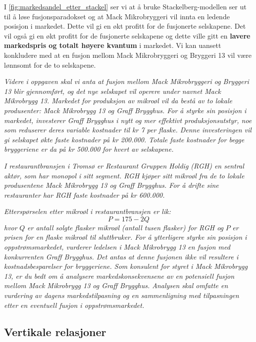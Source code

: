 \documentclass[
  12pt,
  a4paper,
  DIV=11,
  numbers=noendperiod]{scrartcl}
\begin{document}
I \autoref{fig:markedsandel_etter_stackel} ser vi at å bruke
Stackelberg-modellen ser ut til å løse fusjonsparadokset og at Mack
Mikrobryggeri vil innta en ledende posisjon i markedet. Dette vil gi en
økt profitt for de fusjonerte selskapene. Det vil også gi en økt profitt
for de fusjonerte selskapene og dette ville gitt en \textbf{lavere
markedspris og totalt høyere kvantum} i markedet. Vi kan uansett
konkludere med at en fusjon mellom Mack Mikrobryggeri og Bryggeri 13 vil
være lønnsomt for de to selskapene.

\clearpage

\textit{Videre i oppgaven skal vi anta at fusjon mellom Mack Mikrobryggeri og Bryggeri 13 blir gjennomført, og det nye selskapet vil operere under navnet Mack Mikrobrygg 13. Markedet for produksjon av mikroøl vil da bestå av to lokale produsenter: Mack Mikrobrygg 13 og Graff Brygghus. For å styrke sin posisjon i markedet, investerer Graff Brygghus i nytt og mer effektivt produksjonsutstyr, noe som reduserer deres variable kostnader til kr 7 per flaske. Denne investeringen vil gi selskapet økte faste kostnader på kr 200.000. Totale faste kostnader for begge bryggeriene er da på kr 500.000 for hvert av selskapene.}

\textit{I restaurantbransjen i Tromsø er Restaurant Gruppen Holdig (RGH) en sentral aktør, som har monopol i sitt segment. RGH kjøper sitt mikroøl fra de to lokale produsentene Mack Mikrobrygg 13 og Graff Brygghus. For å drifte sine restauranter har RGH faste kostnader på kr 600.000.}

\textit{Etterspørselen etter mikroøl i restaurantbransjen er lik:} 
$$
P = 175 - 2Q
$$ 
\textit{hvor }$Q$\textit{ er antall solgte flasker mikroøl (antall tusen flasker) for RGH og }$P$\textit{ er prisen for en flaske mikroøl til sluttbruker. For å ytterligere styrke sin posisjon i oppstrømsmarkedet, vurderer ledelsen i Mack Mikrobrygg 13 en fusjon med konkurrenten Graff Brygghus. Det antas at denne fusjonen ikke vil resultere i kostnadsbesparelser for bryggeriene. Som konsulent for styret i Mack Mikrobrygg 13, er du bedt om å analysere markedskonsekvensene av en potensiell fusjon mellom Mack Mikrobrygg 13 og Graff Brygghus. Analysen skal omfatte en vurdering av dagens markedstilpasning og en sammenligning med tilpasningen etter en eventuell fusjon i oppstrømsmarkedet.}

\subsection{Vertikale relasjoner}\label{vertikale-relasjoner}
\end{document}
